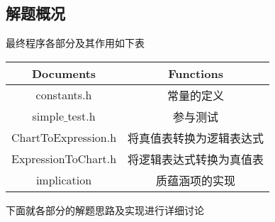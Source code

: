 \subsection{解题概况}
	最终程序各部分及其作用如下表

	\begin{center}
		\begin{tabular}{|c|c|}
			\hline  Documents & Functions\\
			\hline  constants.h & 常量的定义\\
			\hline  simple$\_$test.h & 参与测试\\
			\hline  ChartToExpression.h & 将真值表转换为逻辑表达式\\
			\hline  ExpressionToChart.h & 将逻辑表达式转换为真值表\\
			\hline  implication & 质蕴涵项的实现\\
			\hline
		\end{tabular}
	\end{center}	
	
	下面就各部分的解题思路及实现进行详细讨论	
